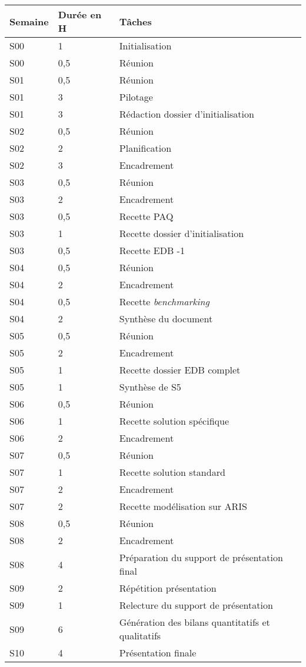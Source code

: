 \documentclass[twoside]{article}
\begin{document}
\begin{longtable}{|l|l|l|}
\hline
Semaine&Durée en H&Tâches\\
\endhead \hline
S00&1&Initialisation\\
\hline
S00&0,5&Réunion\\
\hline
S01&0,5&Réunion\\
\hline
S01&3&Pilotage\\
\hline
S01&3&Rédaction dossier d'initialisation\\
\hline
S02&0,5&Réunion\\
\hline
S02&2&Planification\\
\hline
S02&3&Encadrement\\
\hline
S03&0,5&Réunion\\
\hline
S03&2&Encadrement\\
\hline
S03&0,5&Recette PAQ\\
\hline
S03&1&Recette dossier d'initialisation\\
\hline
S03&0,5&Recette EDB -1\\
\hline
S04&0,5&Réunion\\
\hline
S04&2&Encadrement\\
\hline
S04&0,5&Recette \textsl{benchmarking}\\
\hline
S04&2&Synthèse du document\\
\hline
S05&0,5&Réunion\\
\hline
S05&2&Encadrement\\
\hline
S05&1&Recette dossier EDB complet\\
\hline
S05&1&Synthèse de S5\\
\hline
S06&0,5&Réunion\\
\hline
S06&1&Recette solution spécifique\\
\hline
S06&2&Encadrement\\
\hline
S07&0,5&Réunion\\
\hline
S07&1&Recette solution standard\\
\hline
S07&2&Encadrement\\
\hline
S07&2&Recette modélisation sur ARIS\\
\hline
S08&0,5&Réunion\\
\hline
S08&2&Encadrement\\
\hline
S08&4&Préparation du support de présentation final\\
\hline
S09&2&Répétition présentation\\
\hline
S09&1&Relecture du support de présentation\\
\hline
S09&6&Génération des bilans quantitatifs et qualitatifs\\
\hline
S10&4&Présentation finale\\
\hline
\end{longtable}
\end{document}
